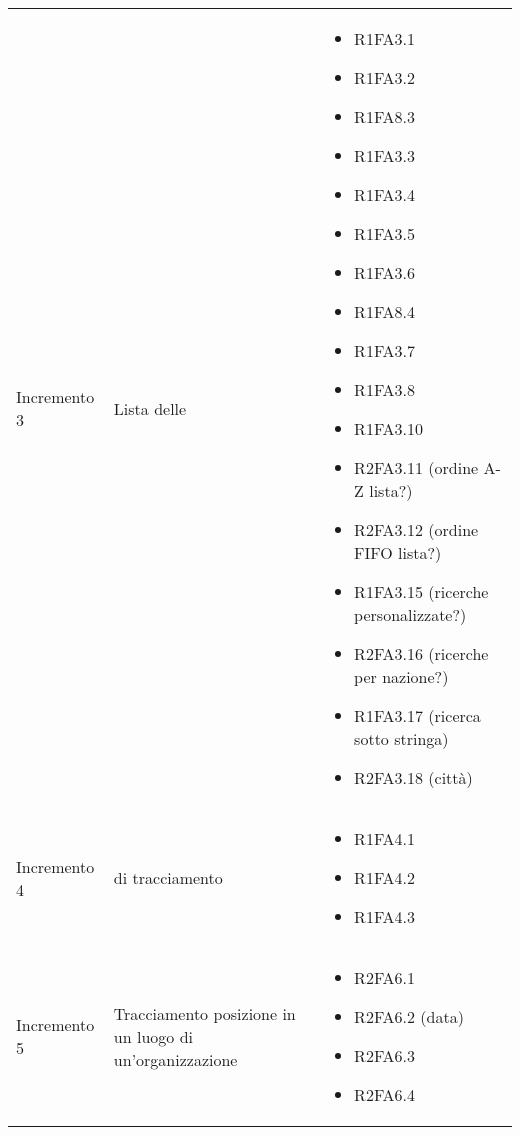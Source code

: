 {\begin{longtable}{C{4cm} C{6cm} C{4cm}}
Incremento 3 & Lista delle  & \begin{itemize}
    \item[ ] R1FA3.1
    \item[ ] R1FA3.2
    \item[ ] R1FA8.3
    \item[ ] R1FA3.3
    \item[ ] R1FA3.4
    \item[ ] R1FA3.5
    \item[ ] R1FA3.6
    \item[ ] R1FA8.4
    \item[ ] R1FA3.7
    \item[ ] R1FA3.8
    \item[ ] R1FA3.10
    \item[ ] R2FA3.11 (ordine A-Z lista?)
    \item[ ] R2FA3.12 (ordine FIFO lista?)
    \item[ ] R1FA3.15 (ricerche personalizzate?)
    \item[ ] R2FA3.16 (ricerche per nazione?)
    \item[ ] R1FA3.17 (ricerca sotto stringa)
    \item[ ] R2FA3.18 (città)
\end{itemize}  \\

Incremento 4 &  di tracciamento & \begin{itemize}
    \item[ ] R1FA4.1
    \item[ ] R1FA4.2
    \item[ ] R1FA4.3
\end{itemize}  \\

Incremento 5 & Tracciamento posizione in un luogo di un'organizzazione & \begin{itemize}
    \item[ ] R2FA6.1
    \item[ ] R2FA6.2 (data)
    \item[ ] R2FA6.3
    \item[ ] R2FA6.4 
\end{itemize}  \\


\end{longtable}
}


